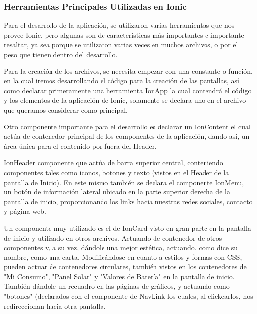                     \subsubsection{Herramientas Principales Utilizadas en Ionic}
                        Para el desarrollo de la aplicación, se utilizaron varias herramientas que nos provee Ionic, pero algunas son de características más importantes e importante resaltar, ya sea porque se utilizaron varias veces en muchos archivos, o por el peso que tienen dentro del desarrollo.\par
                            Para la creación de los archivos, se necesita empezar con una constante o función, en la cual iremos desarrollando el código para la creación de las pantallas, así como declarar primeramente una herramienta IonApp la cual contendrá el código y los elementos de la aplicación de Ionic, solamente se declara uno en el archivo que queramos considerar como principal.\par
                            Otro componente importante para el desarrollo es declarar un IonContent el cual actúa de contenedor principal de los componentes de la aplicación, dando así, un área única para el contenido por fuera del Header.\par
                            IonHeader componente que actúa de barra superior central, conteniendo componentes tales como iconos, botones y texto (vistos en el Header de la pantalla de Inicio). En este mismo también se declara el componente IonMenu, un botón de información lateral ubicado en la parte superior derecha de la pantalla de inicio, proporcionando los links hacia nuestras redes sociales, contacto y página web.\par
                            Un componente muy utilizado es el de IonCard visto en gran parte en la pantalla de inicio y utilizado en otros archivos. Actuando de contenedor de otros componentes y, a su vez, dándole una mejor estética, actuando, como dice su nombre, como una carta. Modificándose en cuanto a estilos y formas con CSS, pueden actuar de contenedores circulares, también vistos en los contenedores de "Mi Consumo", "Panel Solar" y "Valores de Batería" en la pantalla de inicio. También dándole un recuadro en las páginas de gráficos, y actuando como "botones" (declarados con el componente de NavLink los cuales, al clickearlos, nos redireccionan hacia otra pantalla.\par
